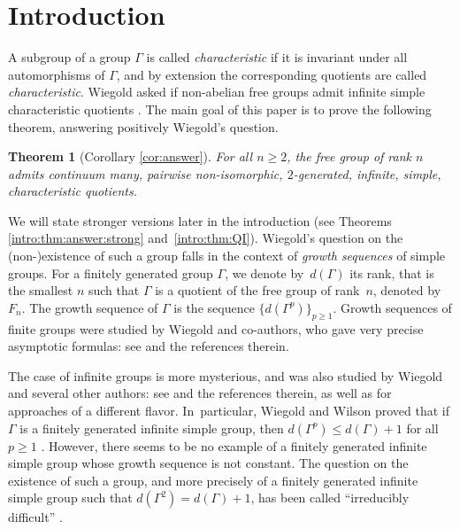 \documentclass[JEP,XML,SOM,Unicode]{cedram}
\newtheorem{theorem}{Theorem}[section]
\theoremstyle{definition}
\begin{document}
\maketitle
\vspace*{-1\baselineskip}
\tableofcontents
\mainmatter

\vspace*{-2\baselineskip}
\mbox{}

\section{Introduction}

A subgroup of a group $\Gamma$ is called \emph{characteristic} if it is invariant under all automorphisms of $\Gamma$, and by extension the corresponding quotients are called \emph{characteristic}.
Wiegold asked if non-abelian free groups admit infinite simple characteristic quotients \cite[Quest.\,6.45]{kourovka}.
The main goal of this paper is to prove the following theorem, answering positively Wiegold's question.

\begin{theorem}[Corollary \ref{cor:answer}]
\label{intro:thm:answer}
For all $n \geq 2$, the free group of rank $n$ admits continuum many, pairwise non-isomorphic, $2$-generated, infinite, simple, characteristic quotients.
\end{theorem}

We will state stronger versions later in the introduction (see Theorems \ref{intro:thm:answer:strong} and~\ref{intro:thm:QI}).
Wiegold's question on the (non-)existence of such a group falls in the context of \emph{growth sequences} of simple groups. For a finitely generated group $\Gamma$, we denote by~$d(\Gamma)$ its rank, that is the smallest $n$ such that $\Gamma$ is a quotient of the free group of rank~$n$, denoted by $F_n$. The growth sequence of $\Gamma$ is the sequence $\{ d(\Gamma^p) \}_{p \geq 1}$.
Growth sequences of finite groups were studied by Wiegold and co-authors, who gave very precise asymptotic formulas: see \cite{w:finite1, w:finite6} and the references therein.

The case of infinite groups is more mysterious, and was also studied by Wiegold and several other authors: see \cite{obratsov, erfanian} and the references therein, as well as \cite{wise, bridson} for approaches of a different flavor. In~particular, Wiegold and Wilson proved that if $\Gamma$ is a finitely generated infinite simple group, then $d(\Gamma^p) \leq d(\Gamma) + 1$ for all $p \geq 1$ \cite{w:fg1}. However, there seems to be no example of a finitely generated infinite simple group whose growth sequence is not constant. The question on the existence of such a group, and more precisely of a finitely generated infinite simple group such that $d(\Gamma^2) = d(\Gamma) + 1$, has been called ``irreducibly difficult'' \cite{w:fg1, obratsov}.
\end{document}
